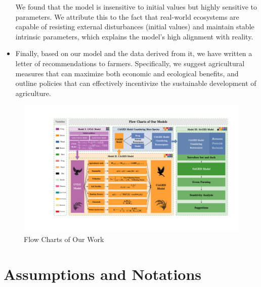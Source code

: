\documentclass{HZNUMCM}
\begin{document}
\begin{itemize}
      We found that the model is insensitive to initial values but highly sensitive to parameters. 
      We attribute this to the fact that real-world ecosystems are capable of resisting external disturbances (initial values) and maintain stable intrinsic parameters, 
      which explains the model's high alignment with reality.
      \item Finally, based on our model and the data derived from it, we have written a letter of recommendations to farmers. 
      Specifically, we suggest agricultural measures that can maximize both economic and ecological benefits, 
      and outline policies that can effectively incentivize the sustainable development of agriculture.
    \end{itemize}
    \begin{figure}[H]
      \centering
      \includegraphics[width=\linewidth]{images/FlowCharts.pdf}
      \caption{Flow Charts of Our Work}
      \label{fig:FlowCharts}
    \end{figure}
  \section{Assumptions and Notations}
\end{document}
